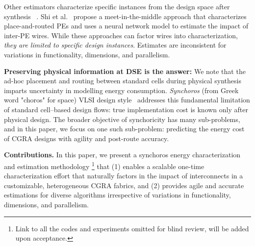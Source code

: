 Other estimators characterize specific instances from the design space after synthesis ~\cite{wijtvliet2021cgra,aspros2025flexible,juracy2022fast}. 
Shi et al.~\cite{shi2024post} propose a meet-in-the-middle approach that characterizes place-and-routed PEs and uses a neural network model to estimate the impact of inter-PE wires.
While these approaches can factor wires into characterization, \textit{they are limited to specific design instances}.
Estimates are inconsistent for variations in functionality, dimensions, and parallelism.

\textbf{Preserving physical information at DSE is the answer:} We note that the ad-hoc placement and routing between standard cells during physical synthesis imparts uncertainty in modelling energy consumption.
\textit{Synchoros} (from Greek word "choros" for space) VLSI design style~\cite{hemani2017synchoricity} addresses this fundamental limitation of standard cell–based design flows: true implementation cost is known only after physical design.
The broader objective of synchoricity has many sub-problems, and in this paper, we focus on one such sub-problem: predicting the energy cost of CGRA designs with agility and post-route accuracy. 

\textbf{Contributions.} In this paper, we present a synchoros energy characterization and estimation methodology \footnote{Link to all the codes and experiments omitted for blind review, will be added upon acceptance.} that (1) enables a scalable one-time characterization effort that naturally factors in the impact of interconnects in a customizable, heterogeneous CGRA fabrics, and (2) provides agile and accurate estimations for diverse algorithms irrespective of variations in functionality, dimensions, and parallelism. 

